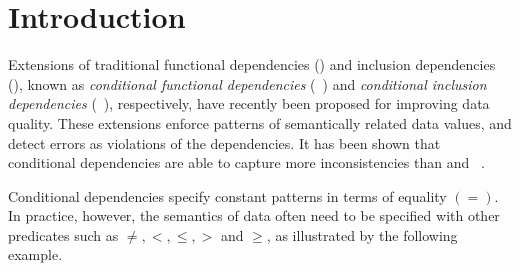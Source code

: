 


\section{Introduction}
\label{sec-intro}



Extensions of traditional functional dependencies (\FDs) and inclusion dependencies
(\INDs), known as {\em conditional functional dependencies} (\CFDs~\cite{CFDs})
and {\em conditional inclusion dependencies} (\CINDs~\cite{tcs-CINDs}),
respectively, have recently been proposed for improving data quality.
These extensions enforce patterns of semantically
related data values, and
detect errors as violations of the dependencies.
It has been shown that conditional dependencies are able to capture more inconsistencies
than \FDs and \INDs~\cite{CFDs,repair,CINDs,tcs-CINDs,book-Fan}.

Conditional dependencies specify constant patterns in terms of
equality $(=)$. In practice, however, the semantics of data often
need to be specified %
with other predicates such as
$\ne, <, \le, >$ and $\ge$, as illustrated by the following example.



